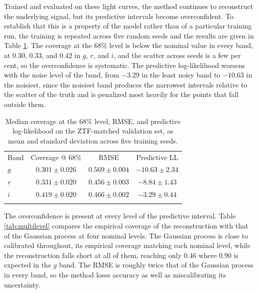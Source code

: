 Trained and evaluated on these light curves, the method continues to reconstruct the underlying signal, but its predictive intervals become overconfident. To establish that this is a property of the model rather than of a particular training run, the training is repeated across five random seeds and the results are given in Table \ref{tab:seeds}. The coverage at the $68\%$ level is below the nominal value in every band, at $0.30$, $0.33$, and $0.42$ in $g$, $r$, and $i$, and the scatter across seeds is a few per cent, so the overconfidence is systematic. The predictive log-likelihood worsens with the noise level of the band, from $-3.29$ in the least noisy band to $-10.63$ in the noisiest, since the noisiest band produces the narrowest intervals relative to the scatter of the truth and is penalized most heavily for the points that fall outside them.

\begin{table}[H]
\centering
\caption[Reconstruction performance across seeds on ZTF-matched data]{\label{tab:seeds} Median coverage at the $68\%$ level, RMSE, and predictive log-likelihood on the ZTF-matched validation set, as mean and standard deviation across five training seeds.}
\begin{tabular}{lccc}
\hline
\noalign{\smallskip}
Band & Coverage @ $68\%$ & RMSE & Predictive LL \\
\noalign{\smallskip}
\hline
\noalign{\smallskip}
$g$ & $0.301 \pm 0.026$ & $0.569 \pm 0.004$ & $-10.63 \pm 2.34$ \\
$r$ & $0.331 \pm 0.020$ & $0.456 \pm 0.003$ & $-8.84 \pm 1.43$ \\
$i$ & $0.419 \pm 0.020$ & $0.466 \pm 0.002$ & $-3.29 \pm 0.44$ \\
\noalign{\smallskip}
\hline
\end{tabular}
\end{table}

The overconfidence is present at every level of the predictive interval. Table \ref{tab:multilevel} compares the empirical coverage of the reconstruction with that of the Gaussian process at four nominal levels. The Gaussian process is close to calibrated throughout, its empirical coverage matching each nominal level, while the reconstruction falls short at all of them, reaching only $0.46$ where $0.90$ is expected in the $g$ band. The RMSE is roughly twice that of the Gaussian process in every band, so the method loses accuracy as well as miscalibrating its uncertainty.

